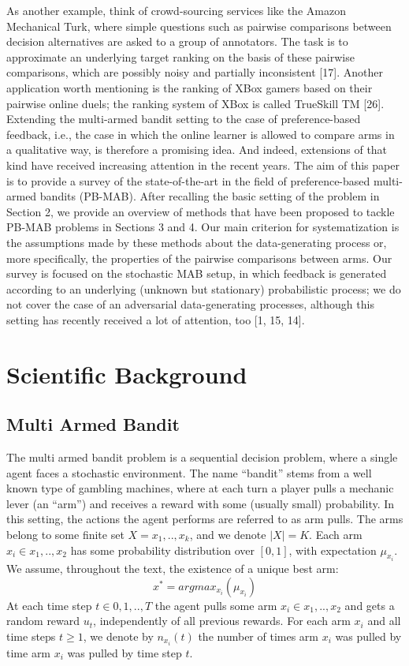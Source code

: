 \documentclass{llncs}
\begin{document}
	As another example, think of crowd-sourcing services like the Amazon Mechanical Turk, where simple questions such as pairwise comparisons between decision alternatives are asked to a group of annotators. 
	The task is to approximate an underlying target ranking on the basis of these pairwise comparisons, which are possibly noisy and partially inconsistent [17]. 
	Another application worth mentioning is the ranking of XBox gamers based on their pairwise online duels; the ranking system of XBox is called TrueSkill TM [26].
	Extending the multi-armed bandit setting to the case of preference-based feedback, i.e., the case in which the online learner is allowed to compare arms in a qualitative way, is therefore a promising idea. 
	And indeed, extensions of that kind have received increasing attention in the recent years. 
	The aim of this paper is to provide a survey of the state-of-the-art in the field of preference-based multi-armed bandits (PB-MAB). 
	After recalling the basic setting of the problem in Section 2, we provide an overview of methods that have been proposed to tackle PB-MAB problems in Sections 3 and 4. 
	Our main criterion for systematization is the assumptions made by these methods about the data-generating process or, more specifically, the properties of the pairwise comparisons between arms. 
	Our survey is focused on the stochastic MAB setup, in which feedback is generated according to an underlying (unknown but stationary) probabilistic process; we do not cover the case of an adversarial data-generating processes, although this setting has recently received a lot of attention, too [1, 15, 14].
\newpage

\section{Scientific Background}

	\subsection{Multi Armed Bandit}
	The multi armed bandit problem is a sequential decision problem, where a single agent faces a stochastic environment. 
	The name “bandit” stems from a well known type of gambling machines, where at each turn a player pulls a mechanic lever (an “arm”) and receives a reward with some (usually small) probability. 
	In this setting, the actions the agent performs are referred to as arm pulls. The arms belong to some finite set $X = {x_1,..,x_k}$, and we denote $|X| = K $. 
	Each arm $x_i \in {x_1,..,x_2}$ has some probability distribution over $[0, 1]$, with expectation $\mu_{x_i}$. 
	We assume, throughout the text, the existence of a unique best arm:
	$$ x^* = argmax_{x_i}(\mu_{x_i})$$
	At each time step $t \in 0,1,..,T$ the agent pulls some arm $x_i \in {x_1,..,x_2}$ and gets a random reward $u_t$, independently of all previous rewards. 
	For each arm $x_i$ and all time steps $t \geq 1$, we denote by $n_{x_i}(t)$ the number of times arm $x_i$ was pulled by time arm $x_i$ was pulled by time step $t$.
\end{document}
